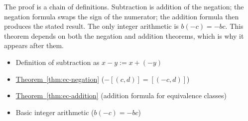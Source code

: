 \begin{remark*}
The proof is a chain of definitions. Subtraction is addition of the
negation; the negation formula swaps the sign of the numerator; the
addition formula then produces the stated result. The only integer
arithmetic is $b(-c) = -bc$. This theorem depends on both the negation
and addition theorems, which is why it appears after them.
\end{remark*}

\begin{dependencies}
\begin{itemize}
  \item Definition of subtraction as $x - y := x + (-y)$
  \item \hyperref[thm:ec-negation]{Theorem~\ref*{thm:ec-negation}}
        \textnormal{($-[(c,d)] = [(-c,d)]$)}
  \item \hyperref[thm:ec-addition]{Theorem~\ref*{thm:ec-addition}}
        \textnormal{(addition formula for equivalence classes)}
  \item Basic integer arithmetic ($b(-c) = -bc$)
\end{itemize}
\end{dependencies}
